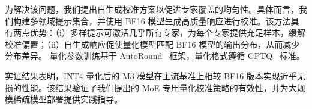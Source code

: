 为解决该问题，我们提出自生成校准方案以促进专家覆盖的均匀性。具体而言，我们构建多领域提示集合，并使用 BF16 模型生成高质量响应进行校准。该方法具有两点优势：（i）多样提示可激活几乎所有专家，为每个专家提供充足样本，缓解校准偏置；（ii）自生成响应促使量化模型匹配 BF16 模型的输出分布，从而减少分布差异。
量化参数训练基于 AutoRound~\cite{DBLP:conf/emnlp/ChengZSCHLL24} 框架，量化格式遵循 GPTQ~\cite{DBLP:journals/corr/abs-2210-17323} 标准。



实证结果表明，INT4 量化后的 M3 模型在主流基准上相较 BF16 版本实现近乎无损的性能。该结果验证了我们提出的 MoE 专用量化校准策略的有效性，并为大规模稀疏模型部署提供实践指导。